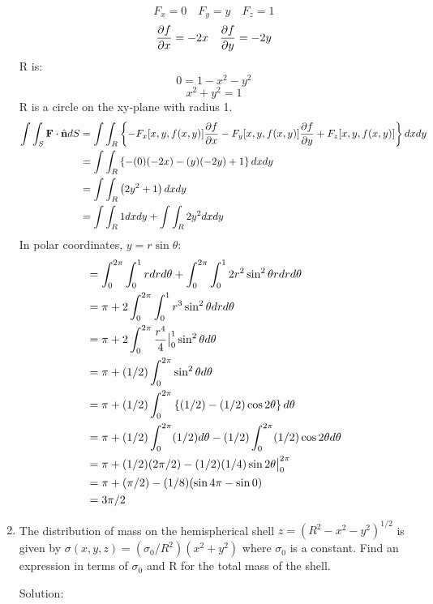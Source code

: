 \documentclass{article}
\begin{document}
\begin{enumerate}
    \[ F_x = 0 \quad F_y = y \quad F_z = 1 \]
    \[ \frac{\partial{f}}{\partial{x}} = -2x \quad \frac{\partial{f}}{\partial{y}} = -2y \]
    R is:
    \[ 0 = 1 - x^2 - y^2 \]
    \[ x^2 + y^2 = 1 \]
    R is a circle on the xy-plane with radius 1.
    \begin{align*}
        \int\int_S \textbf{F} \cdot \hat{\textbf{n}} dS &= \int\int_R \left\{ -F_x[x,y,f(x,y)]\frac{\partial{f}}{\partial{x}} - F_y[x,y,f(x,y)]\frac{\partial{f}}{\partial{y}} + F_z[x,y,f(x,y)] \right\} dxdy \\
        &= \int\int_R \left\{ -(0)(-2x) - (y)(-2y) + 1 \right\} dxdy \\
        &= \int\int_R \left( 2y^2 + 1 \right) dxdy \\
        &= \int\int_R 1 dxdy + \int\int_R 2y^2 dxdy \\
    \end{align*}
    In polar coordinates, $y = r\sin{\theta}$:
    \begin{align*}
        &= \int_0^{2\pi}\int_0^1 rdrd\theta + \int_0^{2\pi}\int_0^1 2r^2\sin^2{\theta} rdrd\theta \\
        &= \pi + 2\int_0^{2\pi}\int_0^1 r^3\sin^2{\theta} drd\theta \\
        &= \pi + 2\int_0^{2\pi} \frac{r^4}{4}\big{|}_0^1 \sin^2{\theta} d\theta \\
        &= \pi + (1/2)\int_0^{2\pi} \sin^2{\theta} d\theta \\
        &= \pi + (1/2)\int_0^{2\pi} \left\{ (1/2) - (1/2)\cos{2\theta} \right\} d\theta \\
        &= \pi + (1/2)\int_0^{2\pi} (1/2) d\theta - (1/2)\int_0^{2\pi}(1/2)\cos{2\theta} d\theta \\
        &= \pi + (1/2)(2\pi/2) - (1/2)(1/4)\sin{2\theta} \big{|}_0^{2\pi} \\
        &= \pi + (\pi/2) - (1/8)(\sin{4\pi} - \sin{0}) \\
        &= 3\pi/2
    \end{align*}

    \item The distribution of mass on the hemispherical shell $z = (R^2 - x^2 - y^2)^{1/2}$
    is given by $\sigma(x,y,z) = (\sigma_0/R^2)(x^2 + y^2)$ where $\sigma_0$ is a constant. Find
    an expression in terms of $\sigma_0$ and R for the total mass of the shell.
    \newcommand\z{(R^2 - x^2 - y^2)^{1/2}}
    \newcommand\sig{(\sigma_0/R^2)(x^2 + y^2)}

    Solution:


\end{enumerate}
\end{document}
